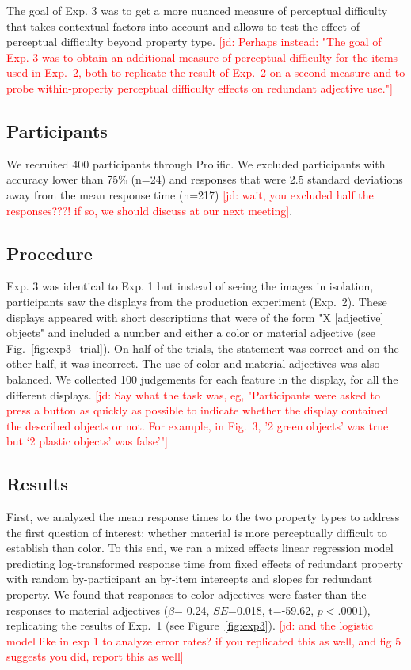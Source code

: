 \documentclass[12pt,letterpaper]{article}
\newcommand{\jd}[1]{\textcolor{Red}{[jd: #1]}}
\begin{document}
The goal of Exp. 3 was to get a more nuanced measure of perceptual difficulty that takes contextual factors into account and allows to test the effect of perceptual difficulty beyond property type. \jd{Perhaps instead: "The goal of Exp. 3 was to obtain an additional measure of perceptual difficulty for the items used in Exp.~2, both to replicate the result of Exp.~2 on a second measure and to probe within-property perceptual difficulty effects on redundant adjective use."}

\subsection{Participants} 

We recruited 400 participants through Prolific. We excluded participants with accuracy lower than 75\% (n=24) and responses that were 2.5 standard deviations away from the mean response time (n=217) \jd{wait, you excluded half the responses???! if so, we should discuss at our next meeting}.

\subsection{Procedure} 

Exp. 3 was identical to Exp. 1 but instead of seeing the images in isolation, participants saw the displays from the production experiment (Exp.~2). These displays appeared with short descriptions that were of the form "X [adjective] objects" and included a number and either a color or material adjective (see Fig.~\ref{fig:exp3_trial}). On half of the trials, the statement was correct and on the other half, it was incorrect. The use of color and material adjectives was also balanced. We collected 100 judgements for each feature in the display, for all the different displays. \jd{Say what the task was, eg, "Participants were asked to press a button as quickly as possible to indicate whether the display contained the described objects or not. For example, in Fig.~3, '2 green objects' was true but `2 plastic objects' was false'"}

\subsection{Results} 

First, we analyzed the mean response times to the two property types to address the first question of interest: whether material is more perceptually difficult to establish than color. To this end, we ran a mixed effects linear regression model predicting log-transformed response time from fixed effects of redundant property with random by-participant an by-item intercepts and slopes for redundant property. We found that responses to color adjectives were faster than the responses to material adjectives ($\beta$= 0.24, $SE$=0.018, t=-59.62, $p$$<$.0001), replicating the results of Exp.~1 (see Figure~\ref{fig:exp3}). \jd{and the logistic model like in exp 1 to analyze error rates? if you replicated this as well, and fig 5 suggests you did, report this as well}
\end{document}
